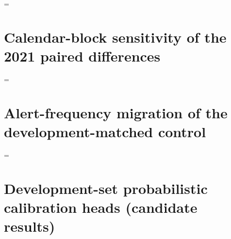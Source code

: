 \documentclass[12pt]{article}
\newcommand{\fitTable}[1]{\begingroup\linespread{1}\selectfont\setbox0=\hbox{#1}\ifdim\wd0>\linewidth\setbox0=\hbox{\resizebox{\linewidth}{!}{\box0}}\fi\ifdim\dimexpr\ht0+\dp0\relax>.68\textheight\resizebox*{!}{.68\textheight}{\box0}\else\box0\fi\endgroup}
\newcommand{\mps}{m s$^{-1}$}
\begin{document}
\begin{table}[h!]
\caption{Area-weighted decomposition of the observed 2022 area with wind speed at or above 25 \mps\ (32 dates, three-seed means). ``No member reaches 25 \mps'' and ``fewer than two supporting members'' are not mutually exclusive categories. The mean shortfall is the fused forecast speed deficit averaged over missed cells.}
\label{tab:diag25}
\vspace*{2mm}
\centering
{\linespread{1.0}\selectfont\small
\fitTable{}}
\end{table}

\clearpage
\section{Calendar-block sensitivity of the 2021 paired differences}

\begin{table}[h!]
\caption{CSI$_{20}$ differences between each joint objective of the linear-stacking experiment and the $\lambda=0$ control on the 2021 sample, with 95\% intervals from resampling initialization dates, 7-day calendar blocks and 14-day calendar blocks (2\,000 draws each). Intervals are pointwise sensitivity intervals of a sparse reused sample.}
\label{tab:calendar}
\vspace*{2mm}
\centering
{\linespread{1.0}\selectfont\small
\fitTable{}}
\end{table}

\clearpage
\section{Alert-frequency migration of the development-matched control}

\begin{table}[h!]
\caption{Alert-area fractions of the development-matched control: the target and achieved frequencies on the 2020 development fields, and the frequencies of the safeguarded simple mean and of the control on the 32 sealed 2022 dates. The 25 \mps\ cell at 120 h has a zero development target and is descriptive only.}
\label{tab:alertmig}
\vspace*{2mm}
\centering
{\linespread{1.0}\selectfont\small
\fitTable{}}
\end{table}

\clearpage
\section{Development-set probabilistic calibration heads (candidate results)}
\end{document}
